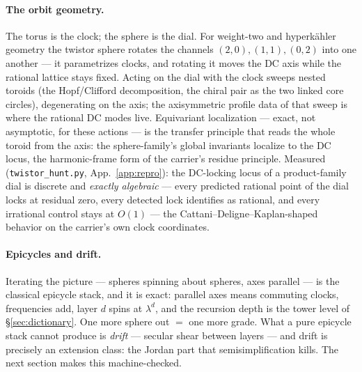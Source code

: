 \documentclass[11pt]{article}
\theoremstyle{definition}
\theoremstyle{remark}
\begin{document}
\paragraph{The orbit geometry.} The torus is the clock; the sphere is the
dial. For weight-two and hyperk\"ahler geometry the twistor sphere rotates the
channels $(2,0),(1,1),(0,2)$ into one another --- it parametrizes clocks, and
rotating it moves the DC axis while the rational lattice stays fixed. Acting on
the dial with the clock sweeps nested toroids (the Hopf/Clifford
decomposition, the chiral pair as the two linked core circles), degenerating on
the axis; the axisymmetric profile data of that sweep is where the rational DC
modes live. Equivariant localization --- exact, not asymptotic, for these
actions --- is the transfer principle that reads the whole toroid from the
axis: the sphere-family's global invariants localize to the DC locus, the
harmonic-frame form of the carrier's residue principle. Measured
(\texttt{twistor\_hunt.py}, App.~\ref{app:repro}): the DC-locking locus of a
product-family dial is discrete and \emph{exactly algebraic} --- every
predicted rational point of the dial locks at residual zero, every detected
lock identifies as rational, and every irrational control stays at $O(1)$ ---
the Cattani--Deligne--Kaplan-shaped behavior on the carrier's own clock
coordinates.

\paragraph{Epicycles and drift.} Iterating the picture --- spheres spinning
about spheres, axes parallel --- is the classical epicycle stack, and it is
exact: parallel axes means commuting clocks, frequencies add, layer $d$ spins
at $\lambda^d$, and the recursion depth is the tower level of
\S\ref{sec:dictionary}. One more sphere out $=$ one more grade. What a pure
epicycle stack cannot produce is \emph{drift} --- secular shear between layers
--- and drift is precisely an extension class: the Jordan part that
semisimplification kills. The next section makes this machine-checked.
\end{document}

